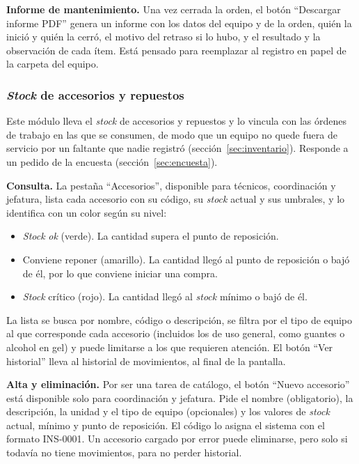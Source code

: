 \documentclass[10pt]{article}
\begin{document}
\textbf{Informe de mantenimiento.} Una vez cerrada la orden, el botón “Descargar informe PDF” genera un informe con los datos del equipo y de la orden, quién la inició y quién la cerró, el motivo del retraso si lo hubo, y el resultado y la observación de cada ítem. Está pensado para reemplazar al registro en papel de la carpeta del equipo.

\subsubsection{\textit{Stock} de accesorios y repuestos}
\label{sec:stock}

Este módulo lleva el \textit{stock} de accesorios y repuestos y lo vincula con las órdenes de trabajo en las que se consumen, de modo que un equipo no quede fuera de servicio por un faltante que nadie registró (sección~\ref{sec:inventario}). Responde a un pedido de la encuesta (sección~\ref{sec:encuesta}).

\textbf{Consulta.} La pestaña “Accesorios”, disponible para técnicos, coordinación y jefatura, lista cada accesorio con su código, su \textit{stock} actual y sus umbrales, y lo identifica con un color según su nivel:
\begin{itemize}
    \item \textit{Stock} \textit{ok} (verde). La cantidad supera el punto de reposición.
    \item Conviene reponer (amarillo). La cantidad llegó al punto de reposición o bajó de él, por lo que conviene iniciar una compra.
    \item \textit{Stock} crítico (rojo). La cantidad llegó al \textit{stock} mínimo o bajó de él.
\end{itemize}

La lista se busca por nombre, código o descripción, se filtra por el tipo de equipo al que corresponde cada accesorio (incluidos los de uso general, como guantes o alcohol en gel) y puede limitarse a los que requieren atención. El botón “Ver historial” lleva al historial de movimientos, al final de la pantalla.

\textbf{Alta y eliminación.} Por ser una tarea de catálogo, el botón “Nuevo accesorio” está disponible solo para coordinación y jefatura. Pide el nombre (obligatorio), la descripción, la unidad y el tipo de equipo (opcionales) y los valores de \textit{stock} actual, mínimo y punto de reposición. El código lo asigna el sistema con el formato INS-0001. Un accesorio cargado por error puede eliminarse, pero solo si todavía no tiene movimientos, para no perder historial.
\end{document}
